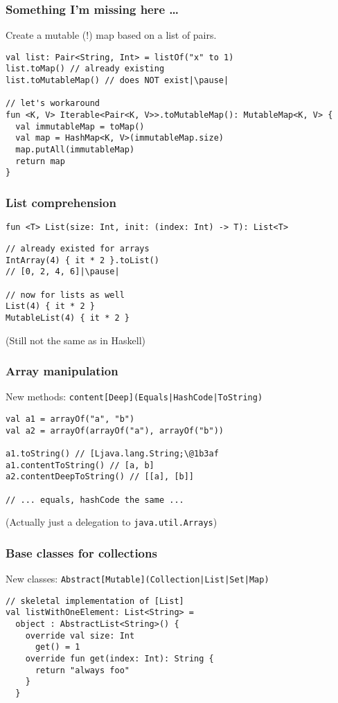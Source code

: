 \begin{frame}[fragile] \frametitle{Something I'm missing here \ldots}
Create a mutable (!) map based on a list of pairs.
\begin{lstlisting}
val list: Pair<String, Int> = listOf("x" to 1)
list.toMap() // already existing
list.toMutableMap() // does NOT exist|\pause|

// let's workaround
fun <K, V> Iterable<Pair<K, V>>.toMutableMap(): MutableMap<K, V> {
  val immutableMap = toMap()
  val map = HashMap<K, V>(immutableMap.size)
  map.putAll(immutableMap)
  return map
}
\end{lstlisting}
\end{frame}

\begin{frame}[fragile] \frametitle{List comprehension}
\footnotesize{\texttt{fun <T> List(size: Int, init: (index: Int) -> T): List<T>}}
\begin{lstlisting}
// already existed for arrays
IntArray(4) { it * 2 }.toList()
// [0, 2, 4, 6]|\pause|

// now for lists as well
List(4) { it * 2 }
MutableList(4) { it * 2 }
\end{lstlisting}
\small{(Still not the same as in Haskell)}
\end{frame}

\begin{frame}[fragile] \frametitle{Array manipulation}
New methods: \texttt{content[Deep](Equals|HashCode|ToString)}
\begin{lstlisting}
val a1 = arrayOf("a", "b")
val a2 = arrayOf(arrayOf("a"), arrayOf("b"))

a1.toString() // [Ljava.lang.String;\@1b3af
a1.contentToString() // [a, b]
a2.contentDeepToString() // [[a], [b]]

// ... equals, hashCode the same ...
\end{lstlisting}
\small{(Actually just a delegation to \texttt{java.util.Arrays})}
\end{frame}

\begin{frame}[fragile] \frametitle{Base classes for collections}
New classes: \texttt{Abstract[Mutable](Collection|List|Set|Map)} \\
\begin{lstlisting}
// skeletal implementation of [List]
val listWithOneElement: List<String> =
  object : AbstractList<String>() {
    override val size: Int
      get() = 1
    override fun get(index: Int): String {
      return "always foo"
    }
  }
\end{lstlisting}
\end{frame}

